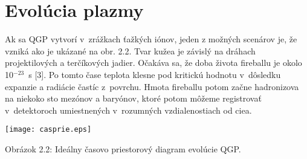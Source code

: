 %
%
%
%
%

\section{Evolúcia plazmy}
Ak sa QGP vytvorí v~zrážkach ťažkých iónov,
jeden z možných scenárov je, že vzniká ako je ukázané na obr. 2.2.
Tvar kuže\softl{}a je závislý na dráhach projektilových a
terčíkových  jadier. Očakáva sa, že doba
života fireballu   je okolo  10$^{-23}$~s [3]. Po tomto čase
teplota klesne pod kritickú hodnotu v~dôsledku expanzie a radiácie
častíc z~povrchu. Hmota fireballu potom začne
hadronizova\softt{} na nieko\softl{}ko sto mezónov a baryónov, ktoré
potom môžeme
registrovať v~detektoroch umiestnených v~rozumných vzdialenostiach
od cie\softl{}a.
\begin{center}
  \texttt{[image: casprie.eps]}
\end{center}
\begin{center}
  Obrázok 2.2: Ideálny časovo priestorový diagram evolúcie QGP.
\end{center}

